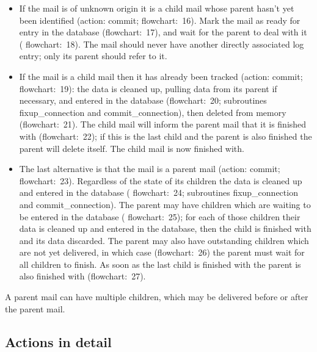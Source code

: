 \documentclass[a4paper,12pt,draft]{article}
\begin{document}
\begin{itemize}

    \item If the mail is of unknown origin it is a child mail whose parent
        hasn't yet been identified (action: commit; flowchart:~16).  Mark
        the mail as ready for entry in the database (flowchart:~17), and
        wait for the parent to deal with it ( flowchart:~18).  The mail
        should never have another directly associated log entry; only its
        parent should refer to it.

    \item If the mail is a child mail then it has already been tracked
        (action: commit; flowchart:~19): the data is cleaned up, pulling
        data from its parent if necessary, and entered in the database
        (flowchart:~20; subroutines fixup\_connection and
        commit\_connection), then deleted from memory (flowchart:~21).  The
        child mail will inform the parent mail that it is finished with
        (flowchart:~22); if this is the last child and the parent is also
        finished the parent will delete itself.  The child mail is now
        finished with.

    \item The last alternative is that the mail is a parent mail (action:
        commit; flowchart:~23).  Regardless of the state of its children
        the data is cleaned up and entered in the database ( flowchart:~24;
        subroutines fixup\_connection and commit\_connection).  The parent
        may have children which are waiting to be entered in the database (
        flowchart:~25); for each of those children their data is cleaned up
        and entered in the database, then the child is finished with and
        its data discarded.  The parent may also have outstanding children
        which are not yet delivered, in which case (flowchart:~26) the
        parent must wait for all children to finish.  As soon as the last
        child is finished with the parent is also finished with
        (flowchart:~27).

\end{itemize}

A parent mail can have multiple children, which may be delivered before or
after the parent mail.  

\subsection{Actions in detail}
\end{document}
